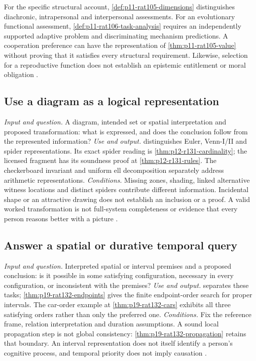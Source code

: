 For the specific structural account, \cref{def:p11-rat105-dimensions}
distinguishes diachronic, intrapersonal and interpersonal assessments.
For an evolutionary functional assessment,
\cref{def:p11-rat106-task-analysis} requires an independently supported
adaptive problem and discriminating mechanism predictions. A cooperation
preference can have the representation of \cref{thm:p11-rat105-value}
without proving that it satisfies every structural requirement. Likewise,
selection for a reproductive function does not establish an epistemic
entitlement or moral obligation \cite{NidaRumelinGutwaldZuber2021,
CosmidesTooby2021Adaptationism}.

\subsection{Use a diagram as a logical representation}
\label{sec:p14-finder-logical-diagrams}
\textit{Input and question.} A diagram, intended set or spatial
interpretation and proposed transformation: what is expressed, and does
the conclusion follow from the represented information?
\textit{Use and output.}  distinguishes
Euler, Venn-I/II and spider representations. Its exact spider reading is
\cref{thm:p12-r131-cardinality}; the licensed fragment has its soundness
proof at \cref{thm:p12-r131-rules}. The checkerboard invariant and
uniform ell decomposition separately address arithmetic representations.
\textit{Conditions.} Missing zones, shading, linked alternative witness
locations and distinct spiders contribute different information. Incidental
shape or an attractive drawing does not establish an inclusion or a proof.
A valid worked transformation is not full-system completeness or evidence
that every person reasons better with a picture \cite{Jamnik2021LogicalDiagrams}.

\subsection{Answer a spatial or durative temporal query}
\label{sec:p14-finder-relational-models}
\textit{Input and question.} Interpreted spatial or interval premises and
a proposed conclusion: is it possible in some satisfying configuration,
necessary in every configuration, or inconsistent with the premises?
\textit{Use and output.}  separates these tasks;
\cref{thm:p19-rat132-endpoints} gives the finite endpoint-order search for
proper intervals. The car-order example at \cref{thm:p19-rat132-cars}
exhibits all three satisfying orders rather than only the preferred one.
\textit{Conditions.} Fix the reference frame, relation interpretation and
duration assumptions. A sound local propagation step is not global
consistency: \cref{thm:p19-rat132-propagation} retains that boundary.
An interval representation does not itself identify a person's cognitive
process, and temporal priority does not imply causation
\cite{Ragni2021SpatialTemporal,Allen1983TemporalIntervals}.

